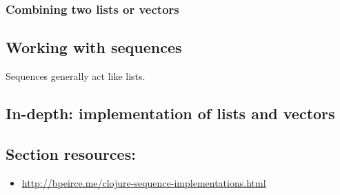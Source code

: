 
\subsubsection{Combining two lists or vectors}\label{subsubsec:into-concat}


\subsection{Working with sequences}\label{subsec:sequences}

Sequences generally act like lists. 


\subsection{In-depth: implementation of lists and vectors}\label{subsec:implement}

\subsection{Section resources:}
\begin{itemize}
\item \url{http://bpeirce.me/clojure-sequence-implementations.html}
\end{itemize}

